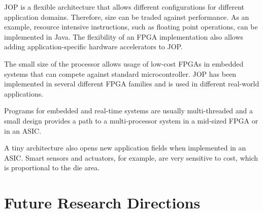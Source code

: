 JOP is a flexible architecture that allows different configurations
for different application domains. Therefore, size can be traded
against performance. As an example, resource intensive instructions,
such as floating point operations, can be implemented in Java. The
flexibility of an FPGA implementation also allows adding
application-specific hardware accelerators to JOP.

The small size of the processor allows usage of low-cost FPGAs in
embedded systems that can compete against standard microcontroller.
JOP has been implemented in several different FPGA families and is
used in different real-world applications.

Programs for embedded and real-time systems are usually
multi-threaded and a small design provides a path to a
multi-processor system in a mid-sized FPGA or in an ASIC.

A tiny architecture also opens new application fields when
implemented in an ASIC. Smart sensors and actuators, for example,
are very sensitive to cost, which is proportional to the die area.


\section{Future Research Directions}

